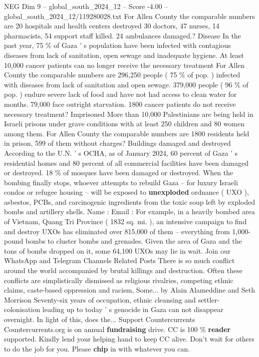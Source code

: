 \begin{textsample}{NEG Dim 9 – global\_south\_2024\_12 – Score -4.00 – global\_south\_2024\_12/119280028.txt}
For Allen County the comparable numbers are 20 hospitals and health centers destroyed 30 doctors, 47 nurses, 14 pharmacists, 54 support staff killed. 24 ambulances damaged.?
Disease In the past year, 75 \% of Gaza ' s population have been infected with contagious diseases from lack of sanitation, open sewage and inadequate hygiene.
At least 10,000 cancer patients can no longer receive the necessary treatment For Allen County the comparable numbers are 296,250 people ( 75 \% of pop. ) infected with diseases from lack of sanitation and open sewage. 379,000 people ( 96 \% of pop. ) endure severe lack of food and have not had access to clean water for months. 79,000 face outright starvation. 1800 cancer patients do not receive necessary treatment?
Imprisoned More than 10,000 Palestinians are being held in Israeli prisons under grave conditions with at least 250 children and 80 women among them.
For Allen County the comparable numbers are 1800 residents held in prison, 599 of them without charges?
Buildings damaged and destroyed According to the U.N. ' s OCHA, as of January 2024, 60 percent of Gaza ' s residential homes and 80 percent of all commercial facilities have been damaged or destroyed. 18 \% of mosques have been damaged or destroyed.
When the bombing finally stops, whoever attempts to rebuild Gaza -- for luxury Israeli condos or refugee housing -- will be exposed to \textbf{unexploded} ordnance ( UXO ), asbestos, PCBs, and carcinogenic ingredients from the toxic soup left by exploded bombs and artillery shells.
Name : Email : For example, in a heavily bombed area of Vietnam, Quang Tri Province ( 1832 sq. mi. ), an intensive campaign to find and destroy UXOs has eliminated over 815,000 of them -- everything from 1,000-pound bombs to cluster bombs and grenades.
Given the area of Gaza and the tons of bombs dropped on it, some 64,100 UXOs may lie in wait.
Join our WhatsApp and Telegram Channels Related Posts There is so much conflict around the world accompanied by brutal killings and destruction.
Often these conflicts are simplistically dismissed as religious rivalries, competing ethnic claims, caste-based oppression and racism, Some... by Alain Alameddine and Seth Morrison Seventy-six years of occupation, ethnic cleansing and settler-colonisation leading up to today ' s genocide in Gaza can not disappear overnight.
In light of this, does the...
Support Countercurrents Countercurrents.org is on annual \textbf{fundraising} drive.
CC is 100 \% \textbf{reader} supported.
Kindly lend your helping hand to keep CC alive.
Don't wait for others to do the job for you.
Please \textbf{chip} in with whatever you can.

\end{textsample}
